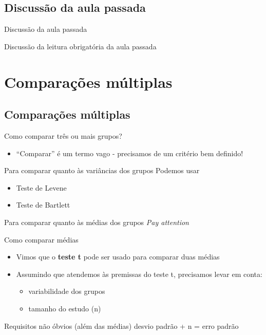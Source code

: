 \documentclass{beamer}
\begin{document}
\subsection{Discussão da aula passada}

\begin{frame}{Discussão da aula passada}
  \begin{block}{}
    Discussão da leitura obrigatória da aula passada
  \end{block}
\end{frame}

\section{Comparações múltiplas}

\subsection{Comparações múltiplas}

\begin{frame}{Como comparar três ou mais grupos?}
  \begin{itemize}
  \item ``Comparar'' é um termo vago - precisamos de um critério bem definido!
  \end{itemize}
  \begin{block}{Para comparar quanto às variâncias dos grupos}
    Podemos usar
    \begin{itemize}
    \item Teste de Levene
    \item Teste de Bartlett
    \end{itemize}
  \end{block}
  \begin{block}{Para comparar quanto às médias dos grupos}
    {\em Pay attention}
  \end{block}
\end{frame}
  
\begin{frame}[label=requisito]{Como comparar médias}
  \begin{itemize}
  \item Vimos que o {\bf teste t} pode ser usado para comparar duas médias
  \item Assumindo que atendemos às premissas do teste t, precisamos levar em conta:
    \begin{itemize}
    \item variabilidade dos grupos
    \item tamanho do estudo (n)
    \end{itemize}
  \end{itemize}
  \begin{block}{Requisitos não óbvios (além das médias)}
    desvio padrão + n = erro padrão
  \end{block}
\end{frame}
\end{document}
